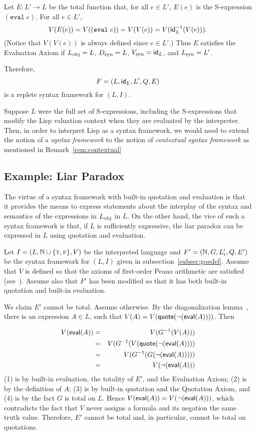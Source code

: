 \documentclass[11pt,fleqn]{article}
\newcommand{\bsp}{\begin{sloppypar}}
\newcommand{\esp}{\end{sloppypar}}
\newcommand{\set}[1]{{\{ #1 \}}}
\newcommand{\mname}[1]{\mbox{\sf #1}}
\newcommand{\tarrow}{\rightarrow}
\newcommand{\Neg}{\neg}
\newcommand{\TRUE}{\mbox{{\sc t}}}
\newcommand{\FALSE}{\mbox{{\sc f}}}
\begin{document}
Let $E : L' \tarrow L$ be the total function that, for all $e \in L'$,
$E(e)$ is the S-expression $(\texttt{eval} \; e)$.  For all $e \in
L'$, \[V(E(e)) = V((\texttt{eval} \; e)) = V(V(e)) =
V(\mname{id}^{-1}_L(V(e))).\] (Notice that $V(V(e))$ is always defined
since $e \in L'$.)  Thus $E$ satisfies the Evaluation Axiom if $L_{\rm
  obj} = L$, $D_{\rm syn} = L$, $V_{\rm syn} = \mname{id}_L$, and
$L_{\rm syn} = L'$.

Therefore, \[F = (L,\mname{id}_L,L',Q,E)\] is a replete syntax
framework for $(L,I)$.

Suppose $L$ were the full set of S-expressions, including the
S-expressions that modify the Lisp valuation context when they are
evaluated by the interpreter.  Then, in order to interpret Lisp as a
syntax framework, we would need to extend the notion of a \emph{syntax
  framework} to the notion of \emph{contextual syntax framework} as
mentioned in Remark~\ref{rem:contextual}

\subsection{Example: Liar Paradox} \label{subsec:liar}

The virtue of a syntax framework with built-in quotation and
evaluation is that it provides the means to express statements about
the interplay of the syntax and semantics of the expressions in
$L_{\rm obj}$ in $L$.  On the other hand, the vice of such a syntax
framework is that, if $L$ is sufficiently expressive, the liar paradox
can be expressed in $L$ using quotation and evaluation.

\bsp Let $I= (L, \mathbb{N} \cup \set{\TRUE,\FALSE}, V)$ be the
interpreted language and $F' = (\mathbb{N},G,L'_{\rm t},Q,E')$ be the
syntax framework for $(L,I)$ given in subsection~\ref{subsec:goedel}.  Assume
that $V$ is defined so that the axioms of first-order Peano arithmetic
are satisfied (see~\cite{Mendelson09}).  Assume also that $F'$ has
been modified so that it has both built-in quotation and built-in
evaluation. \esp

\bsp We claim $E'$ cannot be total.  Assume otherwise.  By the
diagonalization lemma~\cite{Carnap34}, there is an expression $A \in
L$, such that $V(A) = V(\mname{quote}(\Neg(\mname{eval}(A))))$.  Then
\esp \setcounter{equation}{0}
\begin{eqnarray}
V(\mname{eval}(A)) 
  & = & V(G^{-1}(V(A))) \\
  & = & V(G^{-1}(V(\mname{quote}(\Neg(\mname{eval}(A)))) \\
  & = & V(G^{-1}(G(\Neg(\mname{eval}(A))))) \\
  & = & V(\Neg(\mname{eval}(A)))
\end{eqnarray}
(1) is by built-in evaluation, the totality of $E'$, and the
Evaluation Axiom; (2) is by the definition of $A$; (3) is by built-in
quotation and the Quotation Axiom, and (4) is by the fact $G$ is total
on $L$.  Hence $V(\mname{eval}(A)) = V(\Neg(\mname{eval}(A)))$, which
contradicts the fact that $V$ never assigns a formula and its negation
the same truth value.  Therefore, $E'$ cannot be total and, in
particular, cannot be total on quotations.
\end{document}
